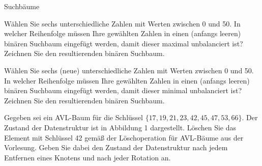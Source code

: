 \documentclass{article}
\begin{document}
\begin{exercises}{Suchbäume}
\item Wählen Sie sechs unterschiedliche Zahlen mit Werten zwischen 0 und 50. In welcher Reihenfolge müssen Ihre gewählten Zahlen in einen (anfangs leeren) binären Suchbaum eingefügt werden, damit dieser maximal unbalanciert ist? Zeichnen Sie den resultierenden binären Suchbaum.
\item Wählen Sie sechs (neue) unterschiedliche Zahlen mit Werten zwischen 0 und 50. In welcher Reihenfolge müssen Ihre gewählten Zahlen in einen (anfangs leeren) binären Suchbaum eingefügt werden, damit dieser minimal unbalanciert ist? Zeichnen Sie den resultierenden binären Suchbaum.
\item Gegeben sei ein AVL-Baum für die Schlüssel $\{17,19,21,23,42,45,47,53,66\}$. Der Zustand der Datenstruktur ist in Abbildung 1 dargestellt. Löschen Sie das Element mit Schlüssel 42 gemäß der Löschoperation für AVL-Bäume aus der Vorlesung. Geben Sie dabei den Zustand der Datenstruktur nach jedem Entfernen eines Knotens und nach jeder Rotation an.
\end{exercises}
\end{document}
